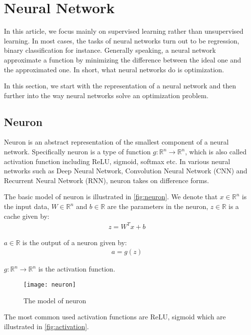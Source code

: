 \section{Neural Network}
\label{sec:NN}
In this article, we focus mainly on supervised learning rather 
than unsupervised learning. In most cases, the tasks of neural 
networks turn out to be regression, binary classification for 
instance. Generally speaking, a neural network approximate a
function by minimizing the difference between the ideal one and
the approximated one. In short, what neural networks do is optimization.
\par In this section, we start with the representation of a neural
network and then further into the way neural networks solve an
optimization problem.

\subsection{Neuron}
Neuron is an abstract representation of the smallest component of
a neural network. Specifically neuron is a type of function 
$ g: \mathbb{R}^n \rightarrow \mathbb{R}^n $, which is also called 
activation function including ReLU, sigmoid, softmax etc. In various 
neural networks such as Deep Neural Network, Convolution Neural 
Network (CNN) and Recurrent Neural Network (RNN), neuron takes on 
difference forms.
\par The basic model of neuron is illustrated in \autoref{fig:neuron}.
We denote that $ x \in \mathbb{R}^n $ is the input data, 
$ W \in \mathbb{R}^n $ and $ b \in \mathbb{R} $ are the parameters in
the neuron, $ z \in \mathbb{R} $ is a cache given by:
\begin{align}
    z = W^Tx + b
\end{align}
\par $ a \in \mathbb{R} $ is the output of a neuron given by:
\begin{align}
    a = g(z)
\end{align}
\par $ g: \mathbb{R}^n \rightarrow \mathbb{R}^n $ is the activation function.

\begin{figure}[H]
    \centering
    \texttt{[image: neuron]}
    \caption{\label{fig:neuron}The model of neuron}
\end{figure}

\par The most common used activation functions are ReLU, sigmoid which are
illustrated in \autoref{fig:activation}.

